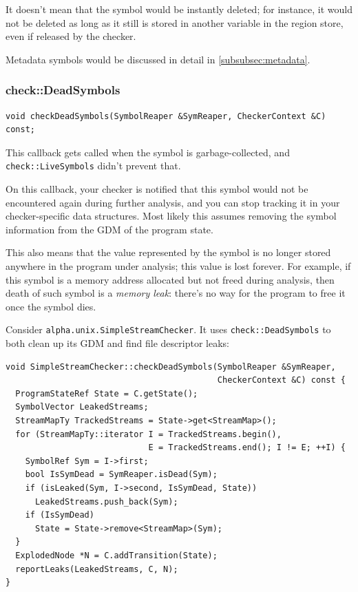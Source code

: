 \documentclass[a4paper,12pt]{article}
\newenvironment{nobr}{\begin{minipage}{\textwidth}\setlength\parskip{1em}
}{\end{minipage}\ignorespacesafterend}
\begin{document}
It doesn't mean that the symbol would be instantly deleted; for instance, it would not be deleted as long as it still is stored in another variable in the region store, even if released by the checker.

Metadata symbols would be discussed in detail in \ref{subsubsec:metadata}.

\begin{nobr}
\subsubsection{check::DeadSymbols}

\begin{lstlisting}[style=cplusplus,numbers=none]
void checkDeadSymbols(SymbolReaper &SymReaper, CheckerContext &C) const;
\end{lstlisting}

This callback gets called when the symbol is garbage-collected, and \lstinline|check::LiveSymbols| didn't prevent that.
\end{nobr}

On this callback, your checker is notified that this symbol would not be encountered again during further analysis, and you can stop tracking it in your checker-specific data structures. Most likely this assumes removing the symbol information from the GDM of the program state.

This also means that the value represented by the symbol is no longer stored anywhere in the program under analysis; this value is lost forever. For example, if this symbol is a memory address allocated but not freed during analysis, then death of such symbol is a \emph{memory leak}: there's no way for the program to free it once the symbol dies.

\begin{nobr}
Consider \lstinline|alpha.unix.SimpleStreamChecker|. It uses \lstinline|check::DeadSymbols| to both clean up its GDM and find file descriptor leaks:

\begin{lstlisting}[style=cplusplus]
void SimpleStreamChecker::checkDeadSymbols(SymbolReaper &SymReaper,
                                           CheckerContext &C) const {
  ProgramStateRef State = C.getState();
  SymbolVector LeakedStreams;
  StreamMapTy TrackedStreams = State->get<StreamMap>();
  for (StreamMapTy::iterator I = TrackedStreams.begin(),
                             E = TrackedStreams.end(); I != E; ++I) {
    SymbolRef Sym = I->first;
    bool IsSymDead = SymReaper.isDead(Sym);
    if (isLeaked(Sym, I->second, IsSymDead, State))
      LeakedStreams.push_back(Sym);
    if (IsSymDead)
      State = State->remove<StreamMap>(Sym);
  }
  ExplodedNode *N = C.addTransition(State);
  reportLeaks(LeakedStreams, C, N);
}
\end{lstlisting}
\end{nobr}
\end{document}
